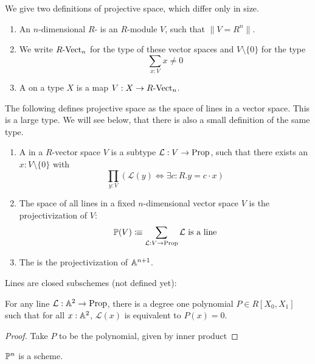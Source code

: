 
We give two definitions of projective space, which differ only in size.

\begin{definition}
  \begin{enumerate}
  \item An $n$-dimensional $R$- is an $R$-module $V$,
    such that $\| V = R^n \|$. 
  \item We write $R\text{-}\mathrm{Vect}_{n}$ for the type of these vector spaces and $V\setminus\{0\}$ for the type
    \[ \sum_{x:V}x\neq 0\]
  \item A  on a type $X$ is a map $V:X\to R\text{-}\mathrm{Vect}_{n}$. 
  \end{enumerate}
\end{definition}

The following defines projective space as the space of lines in a vector space.
This is a large type.
We will see below, that there is also a small definition of the same type.

\begin{definition}
  \begin{enumerate}
  \item   A  in a $R$-vector space $V$ is a subtype $\mathcal L:V\to \mathrm{Prop}$,
    such that there exists an $x:V\setminus\{0\}$ with
    \[ \prod_{y:V}\left(\mathcal L (y) \Leftrightarrow \exists c:R.y=c\cdot x\right)\]
  \item The space of all lines in a fixed $n$-dimensional vector space $V$ is the projectivization of $V$:
    \[ \mathbb{P}(V)\vcentcolon\mspace{-1.2mu}\equiv \sum_{\mathcal L:V\to \mathrm{Prop}} \mathcal L \text{ is a line}  \]
  \item The   is the projectivization of $\mathbb{A}^{n+1}$.
  \end{enumerate}
\end{definition}

Lines are closed subschemes (not defined yet):

\begin{proposition}
  For any line $\mathcal L : \mathbb{A}^{2}\to \mathrm{Prop}$, there is a degree one polynomial $P\in R[X_0,X_1]$ such that
  for all $x:\mathbb{A}^{2}$, $\mathcal L(x)$ is equivalent to $P(x)=0$.
\end{proposition}
\begin{proof}
  Take $P$ to be the polynomial, given by inner product 
\end{proof}


\begin{theorem}
  $\mathbb{P}^n$ is a scheme.
\end{theorem}
